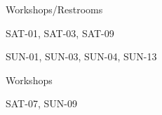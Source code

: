 \documentclass{article}
\newcommand{\room}[1]{
    \noindent
    #1
    \vspace{.2in}

}
\begin{document}
\rssheader[2in]
\vfill

\rssarrowleft[1in]

\begin{center}
    \rssbig
    \room{Workshops/Restrooms}
    \rsstiny
    \room{SAT-01, SAT-03, SAT-09}
    \room{SUN-01, SUN-03, SUN-04, SUN-13}
\end{center}

\vfill

\begin{minipage}{\textwidth}
    \begin{minipage}{.7\textwidth}
        \begin{center}
            \rssbig
            \room{Workshops}
            \rsstiny
            \room{SAT-07, SUN-09}
        \end{center}
    \end{minipage}
    \begin{minipage}{.2\textwidth}
        \begin{center}
            \rssarrowdown[1in]
        \end{center}
    \end{minipage}
\end{minipage}
\end{document}
